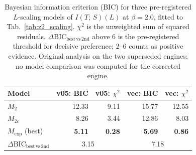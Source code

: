 \documentclass[aps,pra,twocolumn,superscriptaddress,showpacs,floatfix]{revtex4-2}
\newcommand{\MI}{I(T;\,S)}
\begin{document}
\begin{table}[b]
\caption{Bayesian information criterion (BIC) for three pre-registered
$L$-scaling models of $\MI(L)$ at $\beta=2.0$, fitted to
Tab.~\ref{tab:z2_scaling}. $\chi^2$ is the unweighted sum of squared
residuals. $\Delta\mathrm{BIC}_\mathrm{best\,vs\,2nd}$ above $6$ is the
pre-registered threshold for decisive preference; $2$--$6$ counts as positive
evidence. Original analysis on the two superseded engines; no model comparison was computed for the corrected engine.}
\label{tab:z2_bic}
\begin{ruledtabular}
\begin{tabular}{lrrrr}
Model & v05: BIC & v05: $\chi^2$ & vec: BIC & vec: $\chi^2$ \\
\hline
$M_2$                            & 12.33         & 9.11         & 15.77         & 12.55 \\
$M_{2c}$                         &  8.26         & 3.44         & 12.86         &  8.03 \\
$M_\mathrm{exp}$ (best)          & \textbf{5.11} & \textbf{0.28} & \textbf{5.69} & \textbf{0.86} \\
\hline
$\Delta\mathrm{BIC}_\mathrm{best\,vs\,2nd}$ & \multicolumn{2}{c}{3.15} & \multicolumn{2}{c}{7.18} \\
\end{tabular}
\end{ruledtabular}
\end{table}
\end{document}
